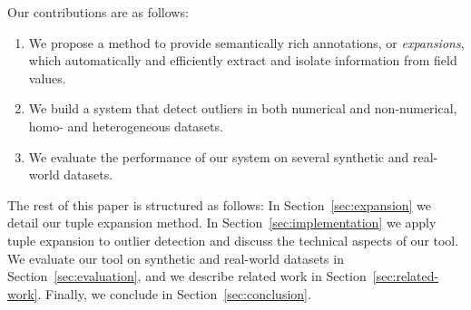 Our contributions are as follows:
\begin{enumerate}
\item We propose a method to provide semantically rich annotations, or \emph{expansions}, which automatically and efficiently extract and isolate information from field values.
\item We build a system that detect outliers in both numerical and non-numerical, homo- and heterogeneous datasets.
\item We evaluate the performance of our system on several synthetic and real-world datasets.
\end{enumerate}

The rest of this paper is structured as follows: In Section~\ref{sec:expansion} we detail our tuple expansion method. In Section~\ref{sec:implementation} we apply tuple expansion to outlier detection and discuss the technical aspects of our tool. We evaluate our tool on synthetic and real-world datasets in Section~\ref{sec:evaluation}, and we describe related work in Section~\ref{sec:related-work}. Finally, we conclude in Section~\ref{sec:conclusion}. %
